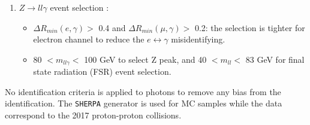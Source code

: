 \begin{enumerate}
\begin{itemize}
    \end{itemize}
    \item $Z \rightarrow ll\gamma$ event selection :
    \begin{itemize}
        \item $\Delta R_{min}(e,\gamma) > $ 0.4 and $\Delta R_{min}(\mu,\gamma) > $ 0.2: the selection is tighter for electron channel to reduce the $e\leftrightarrow\gamma$ misidentifying.
        \item 80 $ < m_{ll\gamma} < $ 100 GeV to select Z peak,  and 40 $ < m_{ll} < $ 83 GeV for final state radiation (FSR) event selection. 
    \end{itemize}
\end{enumerate}
No identification criteria is applied to photons to remove any bias from the identification. The \verb|SHERPA| generator is used for MC samples while the data correspond to the 2017 proton-proton collisions. 
